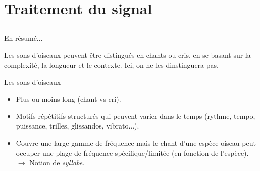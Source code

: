 \documentclass[compress,xcolor=table]{beamer}
\begin{document}
\section{Traitement du signal} \subsection{}

\begin{frame}{En résumé...}

    Les sons d'oiseaux peuvent être distingués en chants ou cris, en se basant sur la complexité, la longueur et le contexte. Ici, on ne les dinstinguera pas.

    \begin{block}{Les sons d'oiseaux}
        \begin{itemize}
            \item Plus ou moins long (chant vs cri).
            \item Motifs répétitifs structurés qui peuvent varier dans le temps (rythme, tempo, puissance, trilles, glissandos, vibrato...).
            \item Couvre une large gamme de fréquence mais le chant d'une espèce oiseau peut occuper une plage de fréquence spécifique/limitée (en fonction de l'espèce).\\
                  $\rightarrow$ Notion de \textit{syllabe}.
        \end{itemize}
    \end{block}

\end{frame}
\end{document}
